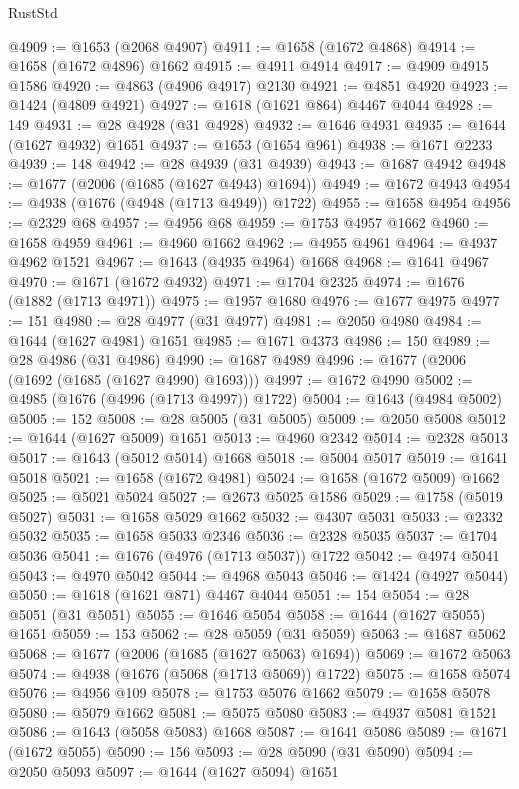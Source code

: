 \begin{lexlean}{RustStd}
\begin{coremodule}
@4909 := @1653 (@2068 @4907)
@4911 := @1658 (@1672 @4868)
@4914 := @1658 (@1672 @4896) @1662
@4915 := @4911 @4914
@4917 := @4909 @4915 @1586
@4920 := @4863 (@4906 @4917) @2130
@4921 := @4851 @4920
@4923 := @1424 (@4809 @4921)
@4927 := @1618 (@1621 @864) @4467 @4044
@4928 := 149
@4931 := @28 @4928 (@31 @4928)
@4932 := @1646 @4931
@4935 := @1644 (@1627 @4932) @1651
@4937 := @1653 (@1654 @961)
@4938 := @1671 @2233
@4939 := 148
@4942 := @28 @4939 (@31 @4939)
@4943 := @1687 @4942
@4948 := @1677 (@2006 (@1685 (@1627 @4943) @1694))
@4949 := @1672 @4943
@4954 := @4938 (@1676 (@4948 (@1713 @4949)) @1722)
@4955 := @1658 @4954
@4956 := @2329 @68
@4957 := @4956 @68
@4959 := @1753 @4957 @1662
@4960 := @1658 @4959
@4961 := @4960 @1662
@4962 := @4955 @4961
@4964 := @4937 @4962 @1521
@4967 := @1643 (@4935 @4964) @1668
@4968 := @1641 @4967
@4970 := @1671 (@1672 @4932)
@4971 := @1704 @2325
@4974 := @1676 (@1882 (@1713 @4971))
@4975 := @1957 @1680
@4976 := @1677 @4975
@4977 := 151
@4980 := @28 @4977 (@31 @4977)
@4981 := @2050 @4980
@4984 := @1644 (@1627 @4981) @1651
@4985 := @1671 @4373
@4986 := 150
@4989 := @28 @4986 (@31 @4986)
@4990 := @1687 @4989
@4996 := @1677 (@2006 (@1692 (@1685 (@1627 @4990) @1693)))
@4997 := @1672 @4990
@5002 := @4985 (@1676 (@4996 (@1713 @4997)) @1722)
@5004 := @1643 (@4984 @5002)
@5005 := 152
@5008 := @28 @5005 (@31 @5005)
@5009 := @2050 @5008
@5012 := @1644 (@1627 @5009) @1651
@5013 := @4960 @2342
@5014 := @2328 @5013
@5017 := @1643 (@5012 @5014) @1668
@5018 := @5004 @5017
@5019 := @1641 @5018
@5021 := @1658 (@1672 @4981)
@5024 := @1658 (@1672 @5009) @1662
@5025 := @5021 @5024
@5027 := @2673 @5025 @1586
@5029 := @1758 (@5019 @5027)
@5031 := @1658 @5029 @1662
@5032 := @4307 @5031
@5033 := @2332 @5032
@5035 := @1658 @5033 @2346
@5036 := @2328 @5035
@5037 := @1704 @5036
@5041 := @1676 (@4976 (@1713 @5037)) @1722
@5042 := @4974 @5041
@5043 := @4970 @5042
@5044 := @4968 @5043
@5046 := @1424 (@4927 @5044)
@5050 := @1618 (@1621 @871) @4467 @4044
@5051 := 154
@5054 := @28 @5051 (@31 @5051)
@5055 := @1646 @5054
@5058 := @1644 (@1627 @5055) @1651
@5059 := 153
@5062 := @28 @5059 (@31 @5059)
@5063 := @1687 @5062
@5068 := @1677 (@2006 (@1685 (@1627 @5063) @1694))
@5069 := @1672 @5063
@5074 := @4938 (@1676 (@5068 (@1713 @5069)) @1722)
@5075 := @1658 @5074
@5076 := @4956 @109
@5078 := @1753 @5076 @1662
@5079 := @1658 @5078
@5080 := @5079 @1662
@5081 := @5075 @5080
@5083 := @4937 @5081 @1521
@5086 := @1643 (@5058 @5083) @1668
@5087 := @1641 @5086
@5089 := @1671 (@1672 @5055)
@5090 := 156
@5093 := @28 @5090 (@31 @5090)
@5094 := @2050 @5093
@5097 := @1644 (@1627 @5094) @1651

\end{coremodule}
\end{lexlean}
